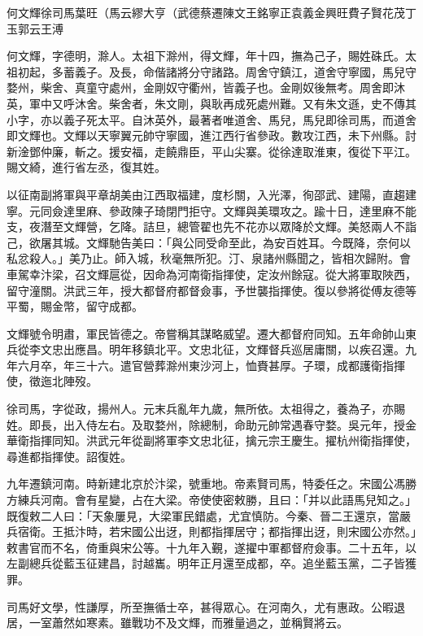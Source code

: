 
\begin{pinyinscope}
何文輝徐司馬葉旺（馬云繆大亨（武德蔡遷陳文王銘寧正袁義金興旺費子賢花茂丁玉郭云王溥

何文輝，字德明，滁人。太祖下滁州，得文輝，年十四，撫為己子，賜姓硃氏。太祖初起，多蓄義子。及長，命偕諸將分守諸路。周舍守鎮江，道舍守寧國，馬兒守婺州，柴舍、真童守處州，金剛奴守衢州，皆義子也。金剛奴後無考。周舍即沐英，軍中又呼沐舍。柴舍者，朱文剛，與耿再成死處州難。又有朱文遜，史不傳其小字，亦以義子死太平。自沐英外，最著者唯道舍、馬兒，馬兒即徐司馬，而道舍即文輝也。文輝以天寧翼元帥守寧國，進江西行省參政。數攻江西，未下州縣。討新淦鄧仲廉，斬之。援安福，走饒鼎臣，平山尖寨。從徐達取淮東，復從下平江。賜文綺，進行省左丞，復其姓。

以征南副將軍與平章胡美由江西取福建，度杉關，入光澤，徇邵武、建陽，直趨建寧。元同僉達里麻、參政陳子琦閉門拒守。文輝與美環攻之。踰十日，達里麻不能支，夜潛至文輝營，乞降。詰旦，總管翟也先不花亦以眾降於文輝。美怒兩人不詣己，欲屠其城。文輝馳告美曰：「與公同受命至此，為安百姓耳。今既降，奈何以私忿殺人。」美乃止。師入城，秋毫無所犯。汀、泉諸州縣聞之，皆相次歸附。會車駕幸汴梁，召文輝扈從，因命為河南衛指揮使，定汝州餘寇。從大將軍取陜西，留守潼關。洪武三年，授大都督府都督僉事，予世襲指揮使。復以參將從傅友德等平蜀，賜金幣，留守成都。

文輝號令明肅，軍民皆德之。帝嘗稱其謀略威望。遷大都督府同知。五年命帥山東兵從李文忠出應昌。明年移鎮北平。文忠北征，文輝督兵巡居庸關，以疾召還。九年六月卒，年三十六。遣官營葬滁州東沙河上，恤賚甚厚。子環，成都護衛指揮使，徵迤北陣歿。

徐司馬，字從政，揚州人。元末兵亂年九歲，無所依。太祖得之，養為子，亦賜姓。即長，出入侍左右。及取婺州，除總制，命助元帥常遇春守婺。吳元年，授金華衛指揮同知。洪武元年從副將軍李文忠北征，擒元宗王慶生。擢杭州衛指揮使，尋進都指揮使。詔復姓。

九年遷鎮河南。時新建北京於汴梁，號重地。帝素賢司馬，特委任之。宋國公馮勝方練兵河南。會有星變，占在大梁。帝使使密敕勝，且曰：「并以此語馬兒知之。」既復敕二人曰：「天象屢見，大梁軍民錯處，尤宜慎防。今秦、晉二王還京，當嚴兵宿衛。王抵汴時，若宋國公出迓，則都指揮居守；都指揮出迓，則宋國公亦然。」敕書官而不名，倚重與宋公等。十九年入覲，遂擢中軍都督府僉事。二十五年，以左副總兵從藍玉征建昌，討越巂。明年正月還至成都，卒。追坐藍玉黨，二子皆獲罪。

司馬好文學，性謙厚，所至撫循士卒，甚得眾心。在河南久，尤有惠政。公暇退居，一室蕭然如寒素。雖戰功不及文輝，而雅量過之，並稱賢將云。


\end{pinyinscope}
